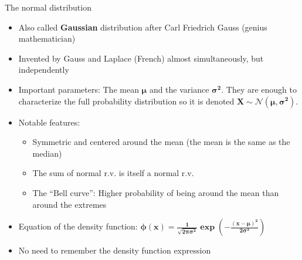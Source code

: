 \documentclass[
  ignorenonframetext,
  aspectratio=169]{beamer}
\providecommand{\tightlist}{%
  \setlength{\itemsep}{0pt}\setlength{\parskip}{0pt}}
\begin{document}
\begin{frame}{The normal distribution}
\protect\hypertarget{the-normal-distribution}{}
\label{normal}

\begin{itemize}
\tightlist
\item
  Also called \textbf{Gaussian} distribution after Carl Friedrich Gauss
  (genius mathematician)
\item
  Invented by Gauss and Laplace (French) almost simultaneously, but
  independently
\item
  Important parameters: The mean \(\bm{\mu}\) and the variance
  \(\bm{\sigma^2}\). They are enough to characterize the full
  probability distribution so it is denoted
  \(\bm{X \sim \mathcal{N}(\mu, \sigma^2)}\).
\item
  Notable features:

  \begin{itemize}
  \tightlist
  \item
    Symmetric and centered around the mean (the mean is the same as the
    median)
  \item
    The sum of normal r.v. is itself a normal r.v.
  \item
    The ``Bell curve'': Higher probability of being around the mean than
    around the extremes
  \end{itemize}
\item
  Equation of the density function:
  \(\bm{ \phi (x) = \frac{1}{\sqrt{2\pi \sigma ^2}} \exp(-\frac{(x - \mu)^2}{2\sigma ^2} ) }\)
\item
  No need to remember the density function expression
\end{itemize}
\end{frame}
\end{document}

